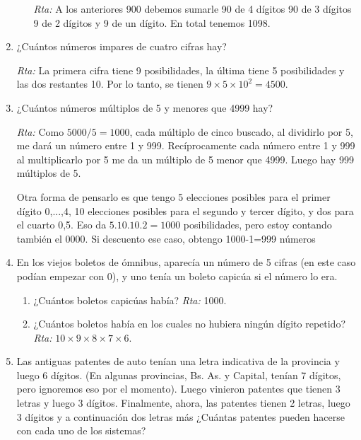 \documentclass[a4paper,12pt,twoside,spanish,reqno]{amsbook}
\numberwithin{equation}{section}
\begin{document}
\begin{enumerate}
\begin{enumerate}
\textit{Rta:} A los anteriores 900 debemos sumarle 90 de 4 dígitos 90 de 3 dígitos 9 de 2 dígitos y 9 de un dígito. En total tenemos 1098.
 
\end{enumerate}

\medskip

\item ¿Cuántos números impares de cuatro cifras hay?

\noindent\textit{Rta:} La primera cifra tiene 9 posibilidades, la última tiene 5 posibilidades y las dos restantes 10. Por lo tanto, se tienen $9\times 5\times 10^2=4500$.

\medskip

\item ¿Cuántos números múltiplos de 5 y menores que 4999 hay?

\noindent\textit{Rta:} Como $5000/5=1000$, cada múltiplo de cinco buscado, al dividirlo por 5, me dará un número entre 1 y 999. Recíprocamente cada número entre 1 y 999 al multiplicarlo por 5 me da un múltiplo de 5 menor que 4999.
Luego hay 999 múltiplos de 5.

 Otra forma de pensarlo es que tengo 5 elecciones posibles para el primer dígito {0,...,4}, 10 elecciones posibles para el segundo y tercer dígito, y dos para el cuarto {0,5}. Eso da $5.10.10.2 =1000$ posibilidades, pero estoy contando también el 0000. Si descuento ese caso, obtengo 1000-1=999 números

\medskip

\item En los viejos boletos de ómnibus, aparecía un número de 5 cifras (en este caso
podían empezar con 0), y uno tenía un boleto capicúa si el número lo era.


\begin{enumerate}
\item ¿Cuántos boletos capicúas había? \noindent\textit{Rta:} 1000.

\item ¿Cuántos boletos había en los cuales no hubiera ningún dígito repetido? \noindent\textit{Rta:} $10\times9\times8\times 7\times6$.
\end{enumerate}

\medskip

\item Las antiguas patentes de auto tenían una letra indicativa de la provincia y luego 6 dígitos. (En algunas provincias, Bs. As. y Capital, tenían 7 dígitos, pero ignoremos eso por el momento). Luego  vinieron patentes que tienen 3 letras y luego 3 dígitos. Finalmente, ahora, las patentes tienen 2 letras, luego 3 dígitos y a continuación dos letras más ¿Cuántas patentes pueden hacerse con cada uno de los sistemas?


\end{enumerate}
\end{document}
